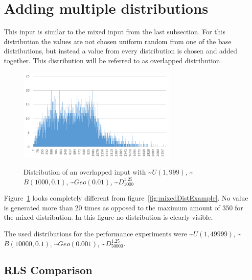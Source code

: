 \section{Adding multiple distributions}
This input is similar to the mixed input from the last subsection.
For this distribution the values are not chosen uniform random from one of the base distributions, but instead a value from every distribution is chosen and added together.
This distribution will be referred to as overlapped distribution.

\begin{figure}[h]
      \caption{Distribution of an overlapped input with \textasciitilde$U(1,999)$, \textasciitilde$B(1000,0.1)$, \textasciitilde$Geo(0.01)$, \textasciitilde$D^{1.25}_{1000}$}
      \centering
      \includegraphics[width=0.7\textwidth]{figures/images/numberGenerator/overlapped.png}\label{fig:overlappedDistExample}
\end{figure}

Figure~\ref{fig:overlappedDistExample} looks completely different from figure~\ref{fig:mixedDistExample}.
No value is generated more than 20 times as opposed to the maximum amount of 350 for the mixed distribution.
In this figure no distribution is clearly visible.

The used distributions for the performance experiments were \textasciitilde$U(1,49999)$, \textasciitilde$B(10000,0.1)$, \textasciitilde$Geo(0.001)$, \textasciitilde$D^{1.25}_{50000}$.
\subsection{RLS Comparison}




